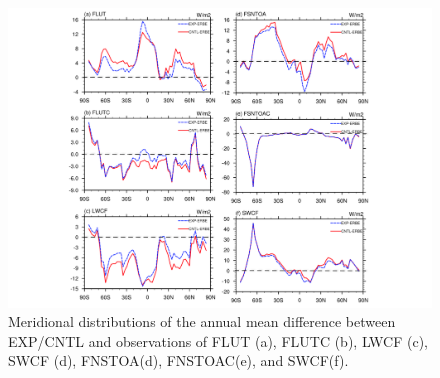 \documentclass[gmd, manuscript]{copernicus}
\begin{document}

\begin{figure}[t]
\includegraphics[width=12cm]{radiation-curve}
\caption{Meridional distributions of the annual mean difference between EXP/CNTL and observations of FLUT (a), FLUTC (b), LWCF (c), SWCF (d), FNSTOA(d), FNSTOAC(e), and SWCF(f).}
\end{figure}

\clearpage





\end{document}
